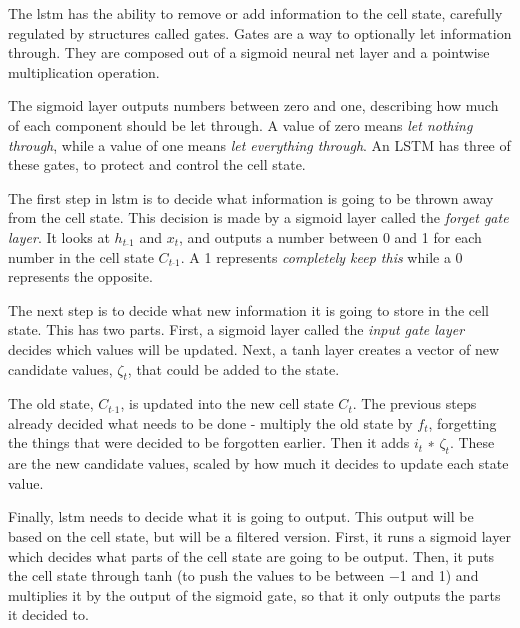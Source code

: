         The \gls{lstm} has the ability to remove or add information to the cell state, carefully regulated by structures called gates. Gates are a way to optionally let information through. They are composed out of a sigmoid neural net layer and a pointwise multiplication operation.
        
        The sigmoid layer outputs numbers between zero and one, describing how much of each component should be let through. A value of zero means \textit{let nothing through}, while a value of one means \textit{let everything through}. An LSTM has three of these gates, to protect and control the cell state.
        
        
        The first step in \gls{lstm} is to decide what information is going to be thrown away from the cell state. This decision is made by a sigmoid layer called the \textit{forget gate layer}. It looks at $h_{t\!^{\_}1}$ and $x_t$, and outputs a number between 0 and 1 for each number in the cell state $C_{t\!^{\_}1}$. A 1 represents \textit{completely keep this} while a 0 represents the opposite.
        
        
        The next step is to decide what new information it is going to store in the cell state. This has two parts. First, a sigmoid layer called the \textit{input gate layer} decides which values will be updated. Next, a tanh layer creates a vector of new candidate values, $\zeta_t$, that could be added to the state.
        
        
        The old state, $C_{t\!^{\_}1}$, is updated into the new cell state $C_t$. The previous steps already decided what needs to be done - multiply the old state by $f_t$, forgetting the things that were decided to be forgotten earlier. Then it adds $i_{t}$ ∗ $\zeta_t$. These are the new candidate values, scaled by how much it decides to update each state value.
        
        
        Finally, \gls{lstm} needs to decide what it is going to output. This output will be based on the cell state, but will be a filtered version. First, it runs a sigmoid layer which decides what parts of the cell state are going to be output. Then, it puts the cell state through tanh (to push the values to be between −1 and 1) and multiplies it by the output of the sigmoid gate, so that it only outputs the parts it decided to.